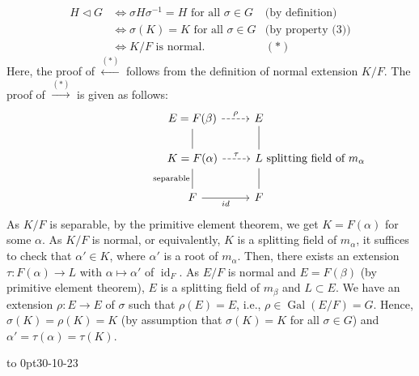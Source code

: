 \documentclass[twoside]{article}
\DeclareMathOperator\Gal{Gal}
\DeclareMathOperator\id{id}
\theoremstyle{remark}
\newcounter{theorem}
\newcommand*\newclass[1]{\par\vbox to 0pt{\hbox{\tiny\sffamily\color{gray}#1}} \par\ignorespaces}
\begin{document}
\begin{enumerate}[label=(\arabic*)]
\begin{align*}
    H \vartriangleleft G & \iff \sigma H \sigma^{-1} = H \text{ for all } \sigma \in G & \text{(by definition)} \\
    & \iff \sigma(K) = K \text{ for all } \sigma \in G & \text{(by property (3))} \\
    & \iff K/F \text{ is normal}. & (*)
  \end{align*}
  Here, the proof of \(\xleftarrow{(*)}\) follows from the definition of normal extension \(K/F\). The proof of \(\xrightarrow{(*)}\) is given as follows:
  \begin{displaymath}
    \begin{tikzcd}
      E = F(\beta) \dar[dash]\rar[dashed,"\rho"] & E \dar[dash] \\
      K = F(\alpha) \dar[dash,"\text{separable}"swap] \rar[dashed,"\tau"] & L \rlap{~splitting field of \(m_\alpha\)} \dar[dash] \\
      F \rar["id"swap] & F
    \end{tikzcd}
  \end{displaymath}
  As \(K/F\) is separable, by the primitive element theorem, we get \(K = F(\alpha)\) for some \(\alpha\). As \(K/F\) is normal, or equivalently, \(K\) is a splitting field of \(m_\alpha\), it suffices to check that \(\alpha' \in K\), where \(\alpha'\) is a root of \(m_\alpha\). Then, there exists an extension \(\tau\colon F(\alpha) \to L\) with \(\alpha \mapsto \alpha'\) of \(\id_F\). As \(E/F\) is normal and \(E = F(\beta)\) (by primitive element theorem), \(E\) is a splitting field of \(m_\beta\) and \(L \subset E\). We have an extension \(\rho\colon E \to E\) of \(\sigma\) such that \(\rho(E) = E\), i.e., \(\rho \in \Gal(E/F) = G\). Hence, \(\sigma(K) = \rho(K) = K\) (by assumption that \(\sigma(K) = K\) for all \(\sigma \in G\)) and \(\alpha' = \tau(\alpha) = \tau(K)\).
\end{enumerate}

\newclass{30-10-23}
\end{document}
